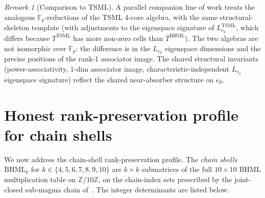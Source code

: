 \documentclass[11pt,reqno]{amsart}
\theoremstyle{plain}
\theoremstyle{definition}
\theoremstyle{remark}
\newtheorem*{remark}{Remark}
\newcommand{\Z}{\mathbb{Z}}
\newcommand{\F}{\mathbb{F}}
\newcommand{\TSML}{\mathrm{TSML}}
\newcommand{\BHML}{\mathrm{BHML}}
\begin{document}
\begin{remark}[Comparison to TSML]
A parallel companion line of work treats the analogous
$\F_{p}$-reductions of the $\TSML$ 4-core algebra, with the same
structural-skeleton template (with adjustments to the eigenspace
signature of $L_{e_{0}}^{\TSML}$, which differs because $T^{\TSML}$
has more non-zero cells than $T^{\BHML}$). The two algebras are
not isomorphic over $\F_{p}$: the difference is in the $L_{e_{0}}$
eigenspace dimensions and the precise positions of the rank-1
associator image. The shared structural invariants
(power-associativity, $1$-dim associator image, characteristic-independent
$L_{e_{2}}$ eigenspace signature) reflect the shared near-absorber
structure on $e_{0}$.
\end{remark}

\section{Honest rank-preservation profile for chain shells}
\label{sec:chain}

We now address the chain-shell rank-preservation profile. The
\emph{chain shells} $\BHML_{k}$ for $k \in \{4, 5, 6, 7, 8, 9, 10\}$
are $k \times k$ submatrices of the full $10 \times 10$ BHML
multiplication table on $\Z/10\Z$, on the chain-index sets
prescribed by the joint-closed sub-magma chain
of~\cite{SandersGishFourCore}. The integer determinants are listed
below.
\end{document}

